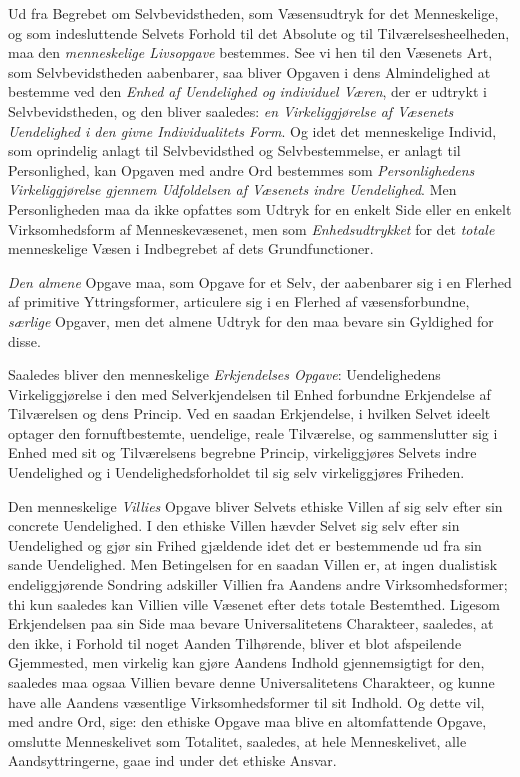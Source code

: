 Ud fra Begrebet om Selvbevidstheden, som Væsensudtryk for det Menneskelige, og
som indesluttende Selvets Forhold til det Absolute og til Tilværelsesheelheden,
maa den \emph{menneskelige Livsopgave} bestemmes. See vi hen til den Væsenets
Art, som Selvbevidstheden aabenbarer, saa bliver Opgaven i dens Almindelighed
at bestemme ved den \emph{Enhed af Uendelighed og individuel Væren}, der er
udtrykt i Selvbevidstheden, og den bliver saaledes: \emph{en Virkeliggjørelse
af Væsenets Uendelighed i den givne Individualitets Form}. Og idet det
menneskelige Individ, som oprindelig anlagt til Selvbevidsthed og
Selvbestemmelse, er anlagt til Personlighed, kan Opgaven med andre Ord
bestemmes som \emph{Personlighedens Virkeliggjørelse gjennem Udfoldelsen af
Væsenets indre Uendelighed}. Men Personligheden maa da ikke opfattes som Udtryk
for en enkelt Side eller en enkelt Virksomhedsform af Menneskevæsenet, men som
\emph{Enhedsudtrykket} for det \emph{totale} menneskelige Væsen i Indbegrebet
af dets Grundfunctioner.

\emph{Den almene} Opgave maa, som Opgave for et Selv, der aabenbarer sig i en
Flerhed af primitive Yttringsformer, articulere sig i en Flerhed af
væsensforbundne, \emph{særlige} Opgaver, men det almene Udtryk for den maa
bevare sin Gyldighed for disse.

Saaledes bliver den menneskelige \emph{Erkjendelses Opgave}: Uendelighedens
Virkeliggjørelse i den med Selverkjendelsen til Enhed forbundne Erkjendelse af
Tilværelsen og dens Princip. Ved en saadan Erkjendelse, i hvilken Selvet ideelt
optager den fornuftbestemte, uendelige, reale Tilværelse, og sammenslutter sig
i Enhed med sit og Tilværelsens begrebne Princip, virkeliggjøres Selvets indre
Uendelighed og i Uendelighedsforholdet til sig selv virkeliggjøres Friheden.

 Den menneskelige \emph{Villies} Opgave bliver Selvets ethiske Villen af sig
selv efter sin concrete Uendelighed. I den ethiske Villen hævder Selvet sig
selv efter sin Uendelighed og gjør sin Frihed gjældende idet det er
bestemmende ud fra sin sande Uendelighed. Men Betingelsen for en saadan Villen
er, at ingen dualistisk endeliggjørende Sondring adskiller Villien fra Aandens
andre Virksomhedsformer; thi kun saaledes kan Villien ville Væsenet efter dets
totale Bestemthed. Ligesom Erkjendelsen paa sin Side maa bevare Universalitetens
Charakteer, saaledes, at den ikke, i Forhold til noget Aanden Tilhørende,
bliver et blot afspeilende Gjemmested, men virkelig kan gjøre Aandens Indhold
gjennemsigtigt for den, saaledes maa ogsaa Villien bevare denne Universalitetens
Charakteer, og kunne have alle Aandens væsentlige Virksomhedsformer til sit
Indhold. Og dette vil, med andre Ord, sige: den ethiske Opgave maa blive en
altomfattende Opgave, omslutte Menneskelivet som Totalitet, saaledes, at hele
Menneskelivet, alle Aandsyttringerne, gaae ind under det ethiske Ansvar.


